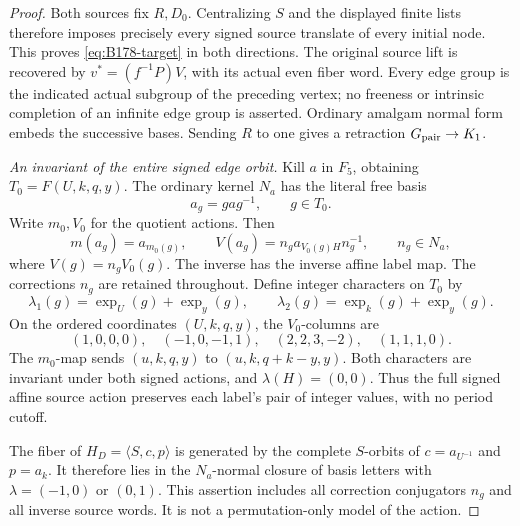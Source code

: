 \begin{proof}
Both sources fix \(R,D_0\). Centralizing \(S\) and the displayed
finite lists therefore imposes precisely every signed source translate
of every initial node. This proves \eqref{eq:B178-target} in both
directions. The original source lift is recovered by
\(v^*=(f^{-1}P)V\), with its actual even fiber word. Every edge group
is the indicated actual subgroup of the preceding vertex; no freeness
or intrinsic completion of an infinite edge group is asserted.
Ordinary amalgam normal form embeds the successive bases. Sending
\(R\) to one gives a retraction \(G_{\rm pair}\to K_1\).

\emph{An invariant of the entire signed edge orbit.}
Kill \(a\) in \(F_5\), obtaining \(T_0=F(U,k,q,y)\).
The ordinary kernel \(N_a\) has the literal free basis
\[
                         a_g=gag^{-1},\qquad g\in T_0.
\]
Write \(m_0,V_0\) for the quotient actions. Then
\[
 m(a_g)=a_{m_0(g)},\qquad
 V(a_g)=n_g a_{V_0(g)H}n_g^{-1},\qquad n_g\in N_a,
\]
where \(V(g)=n_gV_0(g)\). The inverse has the inverse affine label
map. The corrections \(n_g\) are retained throughout.
Define integer characters on \(T_0\) by
\[
 \lambda _1(g)=\operatorname{exp}_U(g)+\operatorname{exp}_y(g),
 \qquad
 \lambda _2(g)=\operatorname{exp}_k(g)+\operatorname{exp}_y(g).
\]
On the ordered coordinates \((U,k,q,y)\), the \(V_0\)-columns are
\[
 (1,0,0,0),\quad(-1,0,-1,1),\quad
 (2,2,3,-2),\quad(1,1,1,0).
\]
The \(m_0\)-map sends \((u,k,q,y)\) to \((u,k,q+k-y,y)\).
Both characters are invariant under both signed actions, and
\(\lambda(H)=(0,0)\). Thus the full signed affine source action
preserves each label's pair of integer values, with no period cutoff.

The fiber of \(H_D=\langle S,c,p\rangle\) is generated by the
complete \(S\)-orbits of \(c=a_{U^{-1}}\) and \(p=a_k\).
It therefore lies in the \(N_a\)-normal closure of basis letters
with \(\lambda=(-1,0)\) or \((0,1)\). This assertion includes
all correction conjugators \(n_g\) and all inverse source words.
It is not a permutation-only model of the action.


\end{proof}
